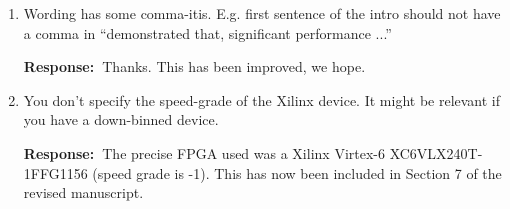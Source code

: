 \documentclass[a4paper, 11pt]{article}
\def\Response{\noindent \textbf{Response:~}}
\newcommand{\Question}[1]{\textcolor[rgb]{0.51,0.00,0.00}{#1}}
\begin{document}
\begin{enumerate}
  \item \Question{Wording has some comma-itis. E.g. first sentence of the intro should not have a comma in ``demonstrated that, significant performance ...''}
      
      \Response Thanks. This has been improved, we hope.\\
      
  \item \Question{You don't specify the speed-grade of the Xilinx device. It might be relevant if you have a down-binned device.}
      
      \Response The precise FPGA used was a Xilinx Virtex-6 XC6VLX240T-1FFG1156 (speed grade is -1). This has now been included in Section 7 of the revised manuscript.
\end{enumerate}
\end{document}
